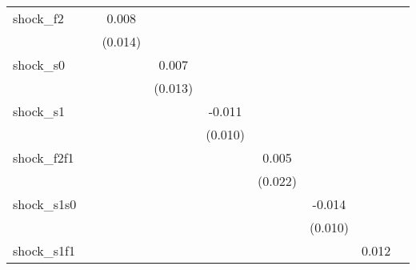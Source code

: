 {\begin{tabular}{l*{8}{c}}
\addlinespace
shock\_f2    &                     &       0.008         &                     &                     &                     &                     &                     &                     \\
            &                     &     (0.014)         &                     &                     &                     &                     &                     &                     \\
\addlinespace
shock\_s0    &                     &                     &       0.007         &                     &                     &                     &                     &                     \\
            &                     &                     &     (0.013)         &                     &                     &                     &                     &                     \\
\addlinespace
shock\_s1    &                     &                     &                     &      -0.011         &                     &                     &                     &                     \\
            &                     &                     &                     &     (0.010)         &                     &                     &                     &                     \\
\addlinespace
shock\_f2f1  &                     &                     &                     &                     &       0.005         &                     &                     &                     \\
            &                     &                     &                     &                     &     (0.022)         &                     &                     &                     \\
\addlinespace
shock\_s1s0  &                     &                     &                     &                     &                     &      -0.014         &                     &                     \\
            &                     &                     &                     &                     &                     &     (0.010)         &                     &                     \\
\addlinespace
shock\_s1f1  &                     &                     &                     &                     &                     &                     &       0.012         &                     \\

\end{tabular}}
